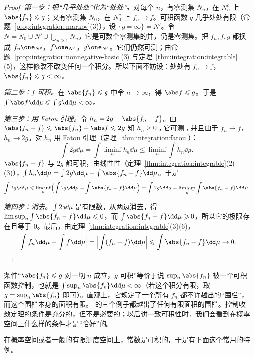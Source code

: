\begin{proof}
\emph{第一步：把“几乎处处”化为“处处”。}对每个 $n$，有零测集 $N_n$，在 $N_n^c$ 上 $\abs{f_n}\leqslant g$；又有零测集 $N_0$，在 $N_0^c$ 上 $f_n\to f$。可积函数 $g$ 几乎处处有限（命题~\ref{prop:integration:markov}(3)），设 $\{g=\infty\}=N'$。令 $N=N_0\cup N'\cup\bigcup_{n\geqslant1}N_n$，它是可数个零测集的并，仍是零测集。把 $f_n,f,g$ 都换成 $f_n\one_{N^c}$，$f\one_{N^c}$，$g\one_{N^c}$。它们仍然可测；由命题~\ref{prop:integration:nonnegative-basic}(3) 与定理~\ref{thm:integration:integrable}(5)，这样修改不改变任何一个积分。所以下面不妨设：处处有 $f_n\to f$，$\abs{f_n}\leqslant g<\infty$。

\emph{第二步：$f$ 可积。}在 $\abs{f_n}\leqslant g$ 中令 $n\to\infty$，得 $\abs f\leqslant g$。于是 $\int\abs f\dd\mu\leqslant\int g\dd\mu<\infty$。

\emph{第三步：用 Fatou 引理。}令 $h_n=2g-\abs{f_n-f}$。由 $\abs{f_n-f}\leqslant\abs{f_n}+\abs f\leqslant2g$ 知 $h_n\geqslant0$；它可测；并且由于 $f_n\to f$，$h_n\to2g$。对 $h_n$ 用 Fatou 引理（定理~\ref{thm:integration:fatou}）：
\[
\int2g\dd\mu=\int\liminf_nh_n\dd\mu\leqslant\liminf_n\int h_n\dd\mu .
\]
$\abs{f_n-f}$ 与 $2g$ 都可积，由线性性（定理~\ref{thm:integration:integrable}(2)(3)），$\int h_n\dd\mu=\int2g\dd\mu-\int\abs{f_n-f}\dd\mu$。于是
\[
\int2g\dd\mu\leqslant\liminf_n\Bigl(\int2g\dd\mu-\int\abs{f_n-f}\dd\mu\Bigr)=\int2g\dd\mu-\limsup_n\int\abs{f_n-f}\dd\mu .
\]

\emph{第四步：消去。}$\int2g\dd\mu$ 是有限数，从两边消去，得 $\limsup_n\int\abs{f_n-f}\dd\mu\leqslant0$。而 $\int\abs{f_n-f}\dd\mu\geqslant0$，所以它的极限存在且等于 $0$。最后，由定理~\ref{thm:integration:integrable}(3)(6)，
\[
\Bigl\lvert\int f_n\dd\mu-\int f\dd\mu\Bigr\rvert=\Bigl\lvert\int(f_n-f)\dd\mu\Bigr\rvert\leqslant\int\abs{f_n-f}\dd\mu\to0 .\qedhere
\]
\end{proof}

\begin{remark}[控制函数的含义]
条件“$\abs{f_n}\leqslant g$ 对一切 $n$ 成立，$g$ 可积”等价于说 $\sup_n\abs{f_n}$ 被一个可积函数控制，也就是 $\int\sup_n\abs{f_n}\dd\mu<\infty$（若这个积分有限，取 $g=\sup_n\abs{f_n}$ 即可）。直观上，它规定了一个所有 $f_n$ 都不许越出的“围栏”，而这个围栏本身的面积有限。 的三个例子都越出了任何有限面积的围栏。控制收敛定理的条件是充分的，但不是必要的；以后讲一致可积性时，我们会看到在概率空间上什么样的条件才是“恰好”的。
\end{remark}

在概率空间或者一般的有限测度空间上，常数是可积的，于是有下面这个常用的特例。

